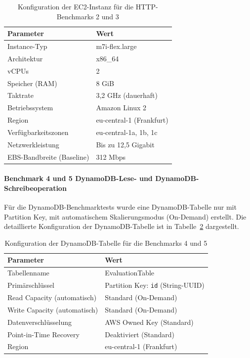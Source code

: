 \begin{table}[H]
\centering
\caption{Konfiguration der EC2-Instanz für die HTTP-Benchmarks 2 und 3}
\label{tab:ec2-instance}
\begin{tabular}{|p{4.5cm}|p{4cm}|}
\hline
\textbf{Parameter} & \textbf{Wert} \\
\hline
Instance-Typ & m7i-flex.large \\
\hline
Architektur & x86\_64 \\
\hline
vCPUs & 2 \\
\hline
Speicher (RAM) & 8 GiB \\
\hline
Taktrate & 3,2 GHz (dauerhaft) \\
\hline
Betriebssystem & Amazon Linux 2 \\
\hline
Region & eu-central-1 (Frankfurt) \\
\hline
Verfügbarkeitszonen & eu-central-1a, 1b, 1c \\
\hline
Netzwerkleistung & Bis zu 12,5 Gigabit \\
\hline
EBS-Bandbreite (Baseline) & 312 Mbps \\
\hline
\end{tabular}
\end{table}

\paragraph{Benchmark 4 und 5 DynamoDB-Lese- und DynamoDB-Schreibeoperation}
Für die DynamoDB-Benchmarktests wurde eine DynamoDB-Tabelle nur mit Partition Key, mit automatischem Skalierungsmodus (On-Demand) erstellt. 
Die detaillierte Konfiguration der DynamoDB-Tabelle ist in Tabelle~\ref{tab:dynamodb-config} dargestellt.

\begin{table}[H]
\centering
\caption{Konfiguration der DynamoDB-Tabelle für die Benchmarks 4 und 5}
\label{tab:dynamodb-config}
\begin{tabular}{|p{4.5cm}|p{4cm}|}
\hline
\textbf{Parameter} & \textbf{Wert} \\
\hline
Tabellenname & EvaluationTable \\
\hline
Primärschlüssel & Partition Key: \texttt{id} (String-UUID)\\
\hline
Read Capacity (automatisch) & Standard (On-Demand) \\
\hline
Write Capacity (automatisch) & Standard (On-Demand) \\
\hline
Datenverschlüsselung & AWS Owned Key (Standard) \\
\hline
Point-in-Time Recovery & Deaktiviert (Standard) \\
\hline
Region & eu-central-1 (Frankfurt) \\
\hline
\end{tabular}
\end{table}

